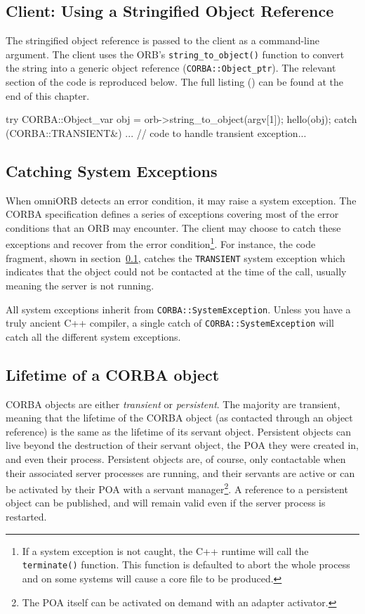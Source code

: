 \documentclass[11pt,oneside,a4paper]{book}
\newcommand{\type}[1]{\texttt{#1}}
\newcommand{\code}[1]{\texttt{#1}}
\newcommand{\op}[1]{\texttt{#1()}}
\newcommand{\term}[1]{\textit{#1}}
\begin{document}
\subsection{Client: Using a Stringified Object Reference}
\label{clnt2}

The stringified object reference is passed to the client as a
command-line argument. The client uses the ORB's
\op{string\_to\_object} function to convert the string into a generic
object reference (\type{CORBA::Object\_ptr}). The relevant section of
the code is reproduced below. The full listing () can
be found at the end of this chapter.

\begin{cxxlisting}
try {
  CORBA::Object_var obj = orb->string_to_object(argv[1]);
  hello(obj);
}
catch (CORBA::TRANSIENT&) {
  ... // code to handle transient exception...
}
\end{cxxlisting}


\subsection{Catching System Exceptions}

When omniORB detects an error condition, it may raise a system
exception.  The CORBA specification defines a series of exceptions
covering most of the error conditions that an ORB may encounter. The
client may choose to catch these exceptions and recover from the error
condition\footnote{If a system exception is not caught, the C++
runtime will call the \op{terminate} function. This function is
defaulted to abort the whole process and on some systems will cause a
core file to be produced.}. For instance, the code fragment, shown in
section~\ref{clnt2}, catches the \code{TRANSIENT} system exception
which indicates that the object could not be contacted at the time of
the call, usually meaning the server is not running.

All system exceptions inherit from \type{CORBA::SystemException}.
Unless you have a truly ancient C++ compiler, a single catch of
\code{CORBA::SystemException} will catch all the different system
exceptions.


\subsection{Lifetime of a CORBA object}

CORBA objects are either \term{transient} or \term{persistent}. The
majority are transient, meaning that the lifetime of the CORBA object
(as contacted through an object reference) is the same as the lifetime
of its servant object. Persistent objects can live beyond the
destruction of their servant object, the POA they were created in, and
even their process. Persistent objects are, of course, only
contactable when their associated server processes are running, and
their servants are active or can be activated by their POA with a
servant manager\footnote{The POA itself can be activated on demand
  with an adapter activator.}. A reference to a persistent object can
be published, and will remain valid even if the server process is
restarted.
\end{document}
